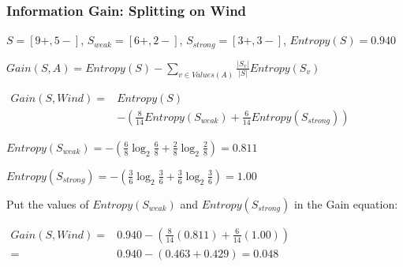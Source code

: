 \begin{frame}[fragile]\frametitle{Information Gain: Splitting on Wind}
$S = [9+,5-]$, \quad $S_{weak} = [6+,2-]$, \quad $S_{strong} = [3+,3-]$, \quad $Entropy(S) = 0.940$
\begin{center}
\footnotesize
$\displaystyle Gain(S,A) = Entropy(S) - \sum_{v \in Values(A)} \frac{|S_v|}{|S|} Entropy(S_v)$
\end{center}
\begin{center}
\footnotesize
$\displaystyle \begin{aligned}
Gain(S,Wind) = {}& Entropy(S) \\
& - \left(\frac{8}{14}Entropy(S_{weak}) + \frac{6}{14}Entropy(S_{strong})\right)
\end{aligned}$
\end{center}
\begin{center}
\footnotesize
$\displaystyle Entropy(S_{weak}) = -\left(\frac{6}{8}\log_2\frac{6}{8} + \frac{2}{8}\log_2\frac{2}{8}\right) = 0.811$
\end{center}
\begin{center}
\footnotesize
$\displaystyle Entropy(S_{strong}) = -\left(\frac{3}{6}\log_2\frac{3}{6} + \frac{3}{6}\log_2\frac{3}{6}\right) = 1.00$
\end{center}
Put the values of $Entropy(S_{weak})$ and $Entropy(S_{strong})$ in the Gain equation:
\begin{center}
\footnotesize
$\displaystyle \begin{aligned}
Gain(S,Wind) = {}& 0.940 - \left(\frac{8}{14}(0.811) + \frac{6}{14}(1.00)\right) \\
= {}& 0.940 - (0.463+0.429) = 0.048
\end{aligned}$
\end{center}
\end{frame}

